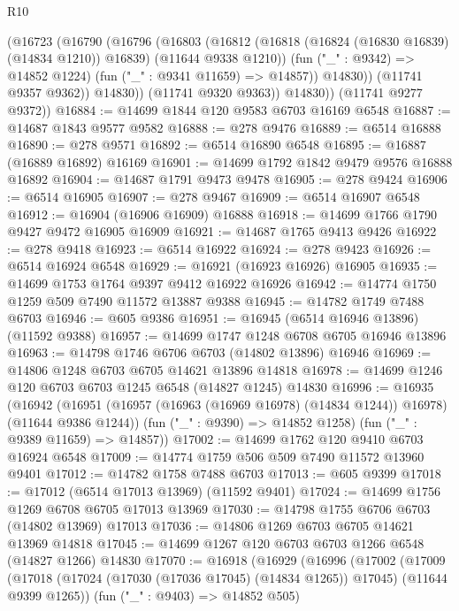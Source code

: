 \begin{lexlean}{R10}
\begin{coremodule}
                (@16723
                  (@16790
                    (@16796
                      (@16803
                        (@16812
                          (@16818 (@16824 (@16830 @16839) (@14834 @1210)) @16839)
                          (@11644 @9338 @1210))
                        (fun ("_" : @9342) => @14852 @1224)
                        (fun ("_" : @9341 @11659) => @14857))
                      @14830))
                  (@11741 @9357 @9362))
                @14830))
            (@11741 @9320 @9363))
          @14830))
      (@11741 @9277 @9372))
@16884 := @14699 @1844 @120 @9583 @6703 @16169 @6548
@16887 := @14687 @1843 @9577 @9582
@16888 := @278 @9476
@16889 := @6514 @16888
@16890 := @278 @9571
@16892 := @6514 @16890 @6548
@16895 := @16887 (@16889 @16892) @16169
@16901 := @14699 @1792 @1842 @9479 @9576 @16888 @16892
@16904 := @14687 @1791 @9473 @9478
@16905 := @278 @9424
@16906 := @6514 @16905
@16907 := @278 @9467
@16909 := @6514 @16907 @6548
@16912 := @16904 (@16906 @16909) @16888
@16918 := @14699 @1766 @1790 @9427 @9472 @16905 @16909
@16921 := @14687 @1765 @9413 @9426
@16922 := @278 @9418
@16923 := @6514 @16922
@16924 := @278 @9423
@16926 := @6514 @16924 @6548
@16929 := @16921 (@16923 @16926) @16905
@16935 := @14699 @1753 @1764 @9397 @9412 @16922 @16926
@16942 := @14774 @1750 @1259 @509 @7490 @11572 @13887 @9388
@16945 := @14782 @1749 @7488 @6703
@16946 := @605 @9386
@16951 := @16945 (@6514 @16946 @13896) (@11592 @9388)
@16957 := @14699 @1747 @1248 @6708 @6705 @16946 @13896
@16963 := @14798 @1746 @6706 @6703 (@14802 @13896) @16946
@16969 := @14806 @1248 @6703 @6705 @14621 @13896 @14818
@16978 := @14699 @1246 @120 @6703 @6703 @1245 @6548 (@14827 @1245) @14830
@16996 := @16935
    (@16942
      (@16951 (@16957 (@16963 (@16969 @16978) (@14834 @1244)) @16978) (@11644 @9386 @1244))
      (fun ("_" : @9390) => @14852 @1258)
      (fun ("_" : @9389 @11659) => @14857))
@17002 := @14699 @1762 @120 @9410 @6703 @16924 @6548
@17009 := @14774 @1759 @506 @509 @7490 @11572 @13960 @9401
@17012 := @14782 @1758 @7488 @6703
@17013 := @605 @9399
@17018 := @17012 (@6514 @17013 @13969) (@11592 @9401)
@17024 := @14699 @1756 @1269 @6708 @6705 @17013 @13969
@17030 := @14798 @1755 @6706 @6703 (@14802 @13969) @17013
@17036 := @14806 @1269 @6703 @6705 @14621 @13969 @14818
@17045 := @14699 @1267 @120 @6703 @6703 @1266 @6548 (@14827 @1266) @14830
@17070 := @16918
    (@16929
      (@16996
        (@17002
          (@17009
            (@17018 (@17024 (@17030 (@17036 @17045) (@14834 @1265)) @17045) (@11644 @9399 @1265))
            (fun ("_" : @9403) => @14852 @505)

\end{coremodule}
\end{lexlean}
